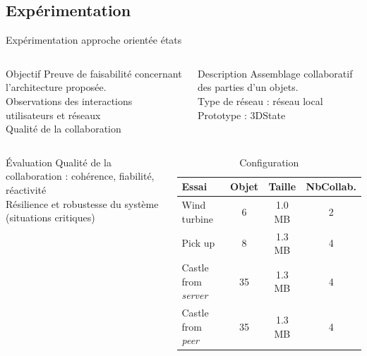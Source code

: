 \subsection{Expérimentation}

\begin{frame}{Expérimentation approche orientée états}

		\begin{columns}[onlytextwidth]
			\begin{alertblock}{Objectif}
				Preuve de faisabilité concernant l'architecture proposée. \\
				Observations des interactions utilisateurs et réseaux\\
				Qualité de la collaboration
			\end{alertblock}
			
			\begin{block}{Description}
				Assemblage collaboratif des parties d'un objets.\\
				Type de réseau : réseau local\\
				Prototype : 3DState
			\end{block}
		\end{columns}
		\begin{columns}[onlytextwidth]
			\begin{block}{Évaluation}
				Qualité de la collaboration : cohérence, fiabilité, réactivité \\
				Résilience et robustesse du système (situations critiques)
			\end{block}
		
			\small
			\begin{table}[!h]
				\caption{Configuration}
				\centering
				\begin{tabular}{lccc}
					\textbf{Essai} & \textbf{Objet} & \textbf{Taille}	& 
					\textbf{NbCollab.}\\ \hline
					Wind turbine			& 6					& 1.0 MB        	& 2 \\ 
					Pick up					& 8					& 1.3 MB         	& 4	\\
					Castle from \textit{server}	& 35				& 1.3 MB        	& 4	\\
					Castle from \textit{peer}& 35 & 1.3 MB & 4 \\ \hline
				\end{tabular}
			\end{table}
		\end{columns}
\end{frame}


